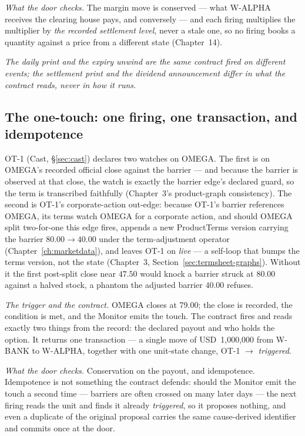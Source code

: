 \documentclass[11pt,a4paper]{article}
\newcommand{\USD}[1]{\mbox{USD~#1}}
\begin{document}
\emph{What the door checks.} The margin move is conserved --- what W-ALPHA
receives the clearing house pays, and conversely --- and each firing multiplies
the multiplier by \emph{the recorded settlement level}, never a stale one, so no
firing books a quantity against a price from a different state (Chapter~14).

\emph{The daily print and the expiry unwind are the same contract fired on
different events; the settlement print and the dividend announcement differ in
what the contract reads, never in how it runs.}

\subsection{The one-touch: one firing, one transaction, and idempotence}

OT-1 (Cast, \S\ref{sec:cast}) declares two watches on OMEGA. The first is on
OMEGA's recorded official close against the barrier --- and because the barrier is observed at that close,
the watch is exactly the barrier edge's declared guard, so the term is
transcribed faithfully (Chapter~3's product-graph consistency). The second is
OT-1's corporate-action out-edge: because OT-1's barrier references OMEGA, its
terms watch OMEGA for a corporate action, and should OMEGA split two-for-one this
edge fires, appends a new ProductTerms version carrying the barrier
$80.00 \rightarrow 40.00$ under the term-adjustment operator
(Chapter~\ref{ch:marketdata}), and leaves OT-1 on \emph{live} --- a self-loop that
bumps the terms version, not the state (Chapter~3,
Section~\ref{sec:termsheet-graphs}). Without it the first post-split close near
$47.50$ would knock a barrier struck at $80.00$ against a halved stock, a phantom
the adjusted barrier $40.00$ refuses.

\emph{The trigger and the contract.} OMEGA closes at 79.00; the close is
recorded, the condition is met, and the Monitor emits the touch. The contract
fires and reads exactly two things from the record: the declared payout and who
holds the option. It returns one transaction --- a single move of
\USD{1{,}000{,}000} from W-BANK to W-ALPHA, together with one unit-state change,
OT-1 $\rightarrow$ \emph{triggered}.

\emph{What the door checks.} Conservation on the payout, and idempotence.
Idempotence is not something the contract defends: should the Monitor emit the
touch a second time --- barriers are often crossed on many later days --- the
next firing reads the unit and finds it already \emph{triggered}, so it proposes
nothing, and even a duplicate of the original proposal carries the same
cause-derived identifier and commits once at the door.
\end{document}
